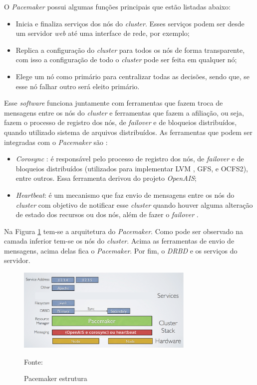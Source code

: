 O \textit{Pacemaker} possui algumas funções principais que estão listadas abaixo:
\begin{itemize}
 \item Inicia e finaliza serviços dos nós do \textit{cluster}. Esses serviços podem ser desde um servidor \textit{web} até uma interface de 
 rede, por exemplo;
 \item Replica a configuração do \textit{cluster} para todos os nós de forma transparente, com isso a configuração de todo o \textit{cluster} 
 pode ser feita em qualquer nó;
 \item Elege um nó como primário para centralizar todas as decisões, sendo que, se esse nó falhar outro será eleito primário.
\end{itemize}

Esse \textit{software} funciona juntamente com ferramentas que fazem troca de mensagens entre os nós do \textit{cluster} e ferramentas que 
fazem a afiliação, ou seja, fazem o processo de registro dos nós, de \textit{failover} e de bloqueios distribuídos, quando utilizado sistema 
de arquivos distribuídos. As ferramentas que podem ser integradas com o \textit{Pacemaker} são \cite{pacemaker}:
\begin{itemize}
 \item \textit{Corosync} \cite{corosync}: é responsável pelo processo de registro dos nós, de \textit{failover} e de bloqueios distribuídos 
 (utilizados para implementar \ac{LVM} \cite{lvm}, \ac{GFS}, e \ac{OCFS2}), entre outros. Essa ferramenta derivou do projeto \textit{OpenAIS};
 \item \textit{Heartbeat}: é um mecanismo que faz envio de mensagens entre os nós do \textit{cluster} com objetivo de notificar esse 
 \textit{cluster} quando houver alguma alteração de estado dos recursos ou dos nós, além de fazer o \textit{failover} \cite{clusterlabs}.
\end{itemize}


Na Figura \ref{fig:pacemaker_tools} tem-se a arquitetura do \textit{Pacemaker}. Como pode ser observado na camada inferior tem-se os nós do 
\textit{cluster}. Acima as ferramentas de envio de mensagens, acima delas fica o \textit{Pacemaker}. Por fim, o \textit{DRBD} e os 
serviços do servidor.

\begin{figure}[h!]
 \centering
 \includegraphics[width=320px]{img/pacemaker_tools.eps}
 \caption{Pacemaker estrutura}
 Fonte: \citet{pacemaker}
 \label{fig:pacemaker_tools}
\end{figure}

